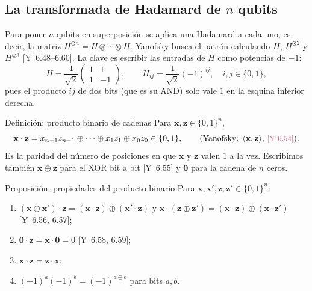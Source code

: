 \documentclass[11pt, a4paper, twoside, openright]{report}
\newcommand{\bx}{\mathbf{x}}
\newcommand{\bz}{\mathbf{z}}
\newcommand{\bcero}{\mathbf{0}}
\newcommand{\bits}[1]{\{0,1\}^{#1}}
\newcommand{\Yan}[1]{\textcolor{rosaviejo}{\small[Y~#1]}}  %
\begin{document}
\subsection{La transformada de Hadamard de $n$ qubits}

\noindent Para poner $n$ qubits en superposición se aplica una Hadamard a cada uno, es decir, la matriz $H^{\otimes n} = H\otimes\cdots\otimes H$. Yanofsky busca el patrón calculando $H$, $H^{\otimes2}$ y $H^{\otimes3}$ \Yan{6.48--6.60}. La clave es escribir las entradas de $H$ como potencias de $-1$:
\[ H = \frac{1}{\sqrt2}\begin{pmatrix} 1 & 1 \\ 1 & -1 \end{pmatrix}, \qquad H_{ij} = \frac{1}{\sqrt2}(-1)^{ij}, \quad i,j\in\{0,1\}, \]
pues el producto $ij$ de dos bits (que es su AND) solo vale $1$ en la esquina inferior derecha.

\begin{teoria}{Definición: producto binario de cadenas}
Para $\bx, \bz\in\bits{n}$,
\[ \bx\cdot\bz = x_{n-1}z_{n-1}\oplus\cdots\oplus x_1z_1\oplus x_0z_0 \in\{0,1\}, \qquad \text{(Yanofsky: } \langle\bx,\bz\rangle\text{, \Yan{6.54}).} \]
Es la paridad del número de posiciones en que $\bx$ y $\bz$ valen $1$ a la vez. Escribimos también $\bx\oplus\bz$ para el XOR bit a bit \Yan{6.55} y $\bcero$ para la cadena de $n$ ceros.
\end{teoria}

\begin{teoria}{Proposición: propiedades del producto binario}
Para $\bx, \bx', \bz, \bz'\in\bits{n}$:
\begin{enumerate}
\item $(\bx\oplus\bx')\cdot\bz = (\bx\cdot\bz)\oplus(\bx'\cdot\bz)$ y $\bx\cdot(\bz\oplus\bz') = (\bx\cdot\bz)\oplus(\bx\cdot\bz')$ \;\Yan{6.56, 6.57};
\item $\bcero\cdot\bz = \bx\cdot\bcero = 0$ \;\Yan{6.58, 6.59};
\item $\bx\cdot\bz = \bz\cdot\bx$;
\item $(-1)^{a}(-1)^{b} = (-1)^{a\oplus b}$ para bits $a, b$.
\end{enumerate}
\end{teoria}
\end{document}
